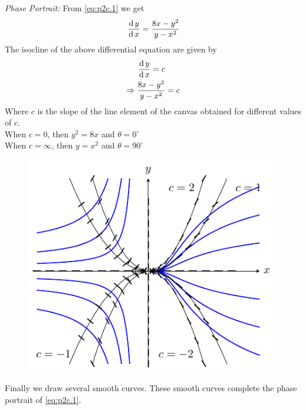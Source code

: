 \documentclass[../main-sheet.tex]{subfiles}
\begin{document}
\begin{soln}[c]
    \emph{Phase Portrait:} From \eqref{eq:p2c.1} we get
    \[\,\frac{\mathrm{d}\,y}{\mathrm{d}\,x}=\frac{8x-y^2}{y-x^2}\]
    The isocline of the above differential equation are given by
    \begin{align*}
        &\,\frac{\mathrm{d}\,y}{\mathrm{d}\,x}=c\\
        \Rightarrow\;&\frac{8x-y^2}{y-x^2}=c
    \end{align*}
    Where \(c\) is the slope of the line element of the canvas obtained for different values of \(c\).\\
    When \(c=0\), then \(y^2=8x\) and \(\theta=0^{\circ}\)\\
    When \(c=\infty\), then \(y=x^2\) and \(\theta=90^{\circ}\)
    \begin{figure}[H]
        \centering
        \includegraphics[scale=2]{pr3.pdf}
    \end{figure}
    Finally we draw several smooth curves. These smooth curves complete the phase portrait of \eqref{eq:p2c.1}.
\end{soln}
\end{document}
